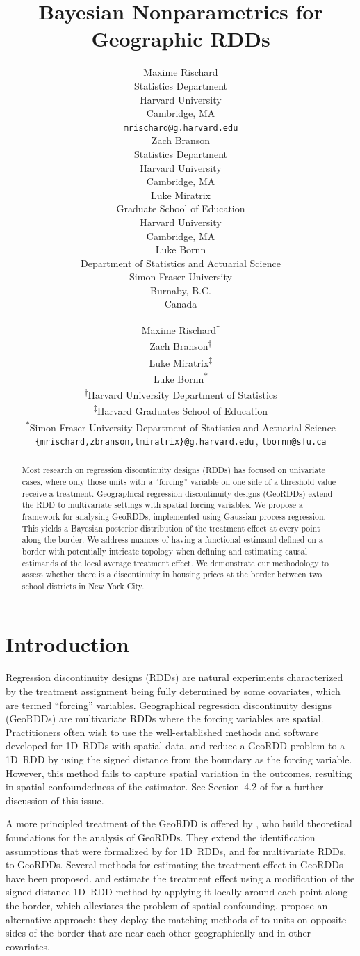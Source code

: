 \documentclass{article}
\title{Bayesian Nonparametrics for Geographic RDDs}
\author{
  Maxime Rischard \\
  Statistics Department \\
  Harvard University \\
  Cambridge, MA \\
  \texttt{mrischard@g.harvard.edu} \\
  \And
  Zach Branson \\
  Statistics Department \\
  Harvard University \\
  Cambridge, MA \\
  \And
  Luke Miratrix \\
  Graduate School of Education \\
  Harvard University \\
  Cambridge, MA \\
  \And
  Luke Bornn \\
  Department of Statistics and Actuarial Science\\
  Simon Fraser University\\
  Burnaby, B.C.\\
  Canada
}
\author{
Maxime Rischard\textsuperscript{$\dagger$}\\
\And
Zach Branson\textsuperscript{$\dagger$}\\
\And
Luke Miratrix\textsuperscript{$\ddagger$}\\
\And
Luke Bornn\textsuperscript{$\ast$}\\
\AND
\normalfont
\normalsize\textsuperscript{$\dagger$}Harvard University Department of Statistics\\
\normalsize\textsuperscript{$\ddagger$}Harvard Graduates School of Education\\
\normalsize\textsuperscript{$\ast$}Simon Fraser University Department of Statistics and Actuarial Science\\
\texttt{\{mrischard,zbranson,lmiratrix\}@g.harvard.edu}\,, \texttt{lbornn@sfu.ca}
}
\begin{document}
\maketitle

\begin{abstract}
    Most research on regression discontinuity designs (RDDs) has focused on univariate cases, where only those units with a ``forcing'' variable on one side of a threshold value receive a treatment.
    Geographical regression discontinuity designs (GeoRDDs) extend the RDD to multivariate settings with spatial forcing variables.
    We propose a framework for analysing GeoRDDs, implemented using Gaussian process regression. 
    This yields a Bayesian posterior distribution of the treatment effect at every point along the border.
    We address nuances of having a functional estimand defined on a border with potentially intricate topology when defining and estimating causal estimands of the local average treatment effect.
    We demonstrate our methodology to assess whether there is a discontinuity in housing prices at the border between two school districts in New York City.
\end{abstract}

\section{Introduction}\label{introduction}

Regression discontinuity designs (RDDs) are natural experiments characterized by the treatment assignment being fully determined by some covariates, which are termed ``forcing'' variables.
Geographical regression discontinuity designs (GeoRDDs) are multivariate RDDs where the forcing variables are spatial.
Practitioners often wish to use the well-established methods and software developed for 1D~RDDs with spatial data,
and reduce a GeoRDD problem to a 1D~RDD by using the signed distance from the boundary as the forcing variable.
However, this method fails to capture spatial variation in the outcomes, resulting in spatial confoundedness of the estimator.
See Section~4.2 of \cite{keele_titiunik_2015} for a further discussion of this issue.

A more principled treatment of the GeoRDD is offered by \cite{keele_titiunik_2015}, who build theoretical foundations for the analysis of GeoRDDs.
They extend the identification assumptions that were formalized by \cite{hahn2001identification} for 1D~RDDs, and \cite{imbens2011regression} for multivariate RDDs, to GeoRDDs.
Several methods for estimating the treatment effect in GeoRDDs have been proposed.
\cite{keele_titiunik_2015} and \cite{keeleoverview} estimate the treatment effect using a modification of the signed distance 1D~RDD method by applying it locally around each point along the border, which alleviates the problem of spatial confounding.
\cite{keele2015enhancing} propose an alternative approach: they deploy the matching methods of \cite{zubizarreta2012using} to units on opposite sides of the border that are near each other geographically and in other covariates.
\end{document}
